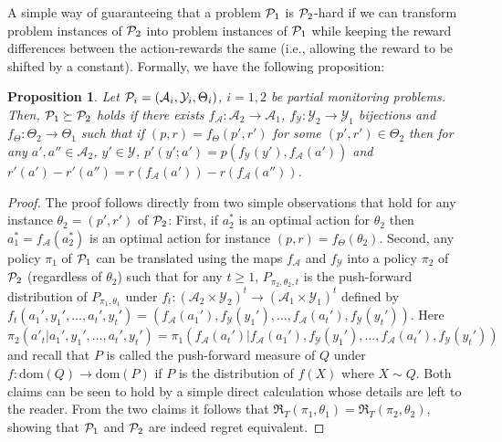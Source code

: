 \documentclass[11pt]{article} %
\newcommand{\Y}{\mathcal{Y}}
\newcommand{\A}{\mathcal{A}}
\newcommand{\Regret}{\mathfrak{R}}
\newtheorem{prop}{Proposition}
\begin{document}
A simple way of guaranteeing that a problem $\P_1$ is $\P_2$-hard if we can transform problem instances of $\P_2$ into 
problem instances of $\P_1$ while keeping the reward differences between the action-rewards the same (i.e., allowing the reward to be shifted by a constant).
Formally, we have the following proposition:
\begin{prop}
Let $\P_i = (\A_i,\Y_i,\Theta_i)$, $i=1,2$ be partial monitoring problems.
Then, $\P_1\succeq \P_2$ holds if there exists $f_{\A}:\A_2\to \A_1$, $f_{\Y}: \Y_2 \to \Y_1$ bijections and $f_{\Theta}:\Theta_2\to \Theta_1$ such that if $(p,r) = f_{\Theta}(p',r')$ for some $(p',r')\in \Theta_2$ then
for any $a',a''\in \A_2$, $y'\in \Y$,
$p'(y';a') = p(f_\Y(y'),f_\A(a'))$ and $r'(a')-r'(a'') = r(f_\A(a')) - r(f_\A(a''))$.
\end{prop}
\begin{proof}
The proof follows directly from two simple observations 
that hold for any instance $\theta_2 = (p',r')$ of $\P_2$: 
First, if $a_2^*$ is an optimal action for $\theta_2$
then $a_1^*=f_\A(a_2^*)$ is an optimal action for instance $(p,r) = f_\Theta(\theta_2)$.
Second, any policy $\pi_1$ of $\P_1$ can be translated using the maps $f_\A$ and $f_\Y$ into a policy $\pi_2$ of $\P_2$ (regardless of $\theta_2$) such that
for any $t\ge 1$,
$P_{\pi_2,\theta_2,t}$ is the push-forward distribution 
of $P_{\pi_1,\theta_1}$ under $f_t:(\A_2\times \Y_2)^t \to (\A_1\times \Y_1)^t$
defined by $f_t(a_1',y_1',\dots,a_t',y_t') = (f_\A(a_1'),f_\Y(y_1'),\dots,f_\A(a_t'),f_\Y(y_t'))$. 
Here $\pi_2(a'_t|a_1',y_1',\dots,a_t',y_t') = \pi_1( f_\A(a_t')| f_\A(a_1'),f_\Y(y_1'),\dots,f_\A(a_t'),f_\Y(y_t'))$ and recall that $P$ is called the push-forward measure of $Q$ under $f:\mathrm{dom}(Q)\to \mathrm{dom}(P)$ if $P$ is the distribution of $f(X)$ where $X\sim Q$.
Both claims can be seen to hold by a simple direct calculation whose details are left 
to the reader.
From the two claims it follows that $\Regret_T(\pi_1,\theta_1)
= \Regret_T(\pi_2,\theta_2)$, showing that $\P_1$ and $\P_2$ are indeed
regret equivalent.
\end{proof}

\fi



%
%
\end{document}
